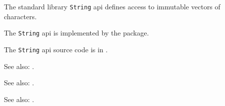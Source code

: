 
The standard library {\tt String} api defines access to immutable vectors of characters.

The {\tt String} api is implemented by the  package.

The {\tt String} api source code is in .

See also:  .

See also:  .

See also: .
